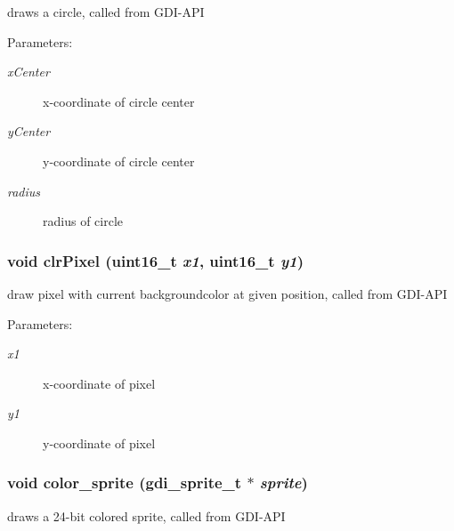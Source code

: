 draws a circle, called from GDI-API 

\begin{Desc}
\item[Parameters:]
\begin{description}
\item[{\em xCenter}]x-coordinate of circle center \item[{\em yCenter}]y-coordinate of circle center \item[{\em radius}]radius of circle \end{description}
\end{Desc}
\hypertarget{group__graphic__device_gb5f226f1613f7f70a1e068c5fa2e4b56}{
\subsubsection[{clrPixel}]{\setlength{\rightskip}{0pt plus 5cm}void clrPixel (uint16\_\-t {\em x1}, \/  uint16\_\-t {\em y1})}}
\label{group__graphic__device_gb5f226f1613f7f70a1e068c5fa2e4b56}


draw pixel with current backgroundcolor at given position, called from GDI-API 

\begin{Desc}
\item[Parameters:]
\begin{description}
\item[{\em x1}]x-coordinate of pixel \item[{\em y1}]y-coordinate of pixel \end{description}
\end{Desc}
\hypertarget{group__graphic__device_ga7267153b94e4ea20df9231fbc208a19}{
\subsubsection[{color\_\-sprite}]{\setlength{\rightskip}{0pt plus 5cm}void color\_\-sprite ({\bf gdi\_\-sprite\_\-t} $\ast$ {\em sprite})}}
\label{group__graphic__device_ga7267153b94e4ea20df9231fbc208a19}


draws a 24-bit colored sprite, called from GDI-API 

